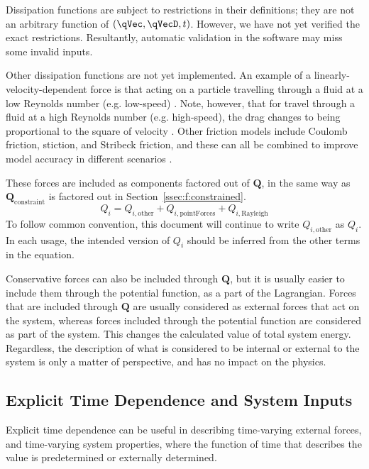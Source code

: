 \documentclass[11pt]{article}
\renewcommand{\secref}[1]{Section~\ref{#1}}
\begin{document}
Dissipation functions are subject to restrictions in their definitions; they are not an arbitrary function of $(\qVec, \qVecD, t)$. However, we have not yet verified the exact restrictions. Resultantly, automatic validation in the software may miss some invalid inputs.

Other dissipation functions are not yet implemented. An example of a linearly-velocity-dependent force is that acting on a particle travelling through a fluid at a low Reynolds number (e.g. low-speed) \cite{RFb-12}. Note, however, that for travel through a fluid at a high Reynolds number (e.g. high-speed), the drag changes to being proportional to the square of velocity \cite{RFb-12}. Other friction models include Coulomb friction, stiction, and Stribeck friction, and these can all be combined to improve model accuracy in different scenarios \cite{RF1-22}.

These forces are included as components factored out of $\mathbf{Q}$, in the same way as $\mathbf{Q}_{\mathrm{constraint}}$ is factored out in \secref{ssec:f:constrained}.
\begin{equation}
    Q_{i} = Q_{i,\mathrm{other}} + Q_{i,\mathrm{pointForces}} + Q_{i,\mathrm{Rayleigh}}
\end{equation}
To follow common convention, this document will continue to write $Q_{i,\mathrm{other}}$ as $Q_{i}$. In each usage, the intended version of $Q_{i}$ should be inferred from the other terms in the equation.

Conservative forces can also be included through $\mathbf{Q}$, but it is usually easier to include them through the potential function, as a part of the Lagrangian. Forces that are included through $\mathbf{Q}$ are usually considered as external forces that act on the system, whereas forces included through the potential function are considered as part of the system. This changes the calculated value of total system energy. Regardless, the description of what is considered to be internal or external to the system is only a matter of perspective, and has no impact on the physics.


\subsection{Explicit Time Dependence and System Inputs} \label{ssec:f:inputs}
Explicit time dependence can be useful in describing time-varying external forces, and time-varying system properties, where the function of time that describes the value is predetermined or externally determined.
\end{document}
